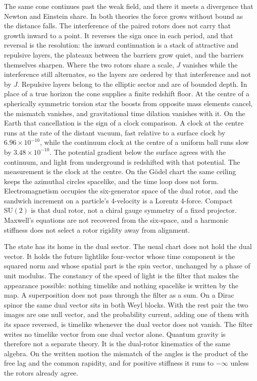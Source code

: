 \documentclass[a4paper]{article}
\begin{document}
The same cone continues past the weak field, and there it meets a divergence that Newton and Einstein share. In both theories the force grows without bound as the distance falls. The interference of the paired rotors does not carry that growth inward to a point. It reverses the sign once in each period, and that reversal is the resolution: the inward continuation is a stack of attractive and repulsive layers, the plateaux between the barriers grow quiet, and the barriers themselves sharpen. Where the two rotors share a scale, $J$ vanishes while the interference still alternates, so the layers are ordered by that interference and not by $J$. Repulsive layers belong to the elliptic sector and are of bounded depth. In place of a true horizon the cone supplies a finite redshift floor. At the centre of a spherically symmetric torsion star the boosts from opposite mass elements cancel, the mismatch vanishes, and gravitational time dilation vanishes with it. On the Earth that cancellation is the sign of a clock comparison. A clock at the centre runs at the rate of the distant vacuum, fast relative to a surface clock by \(6.96\times 10^{-10}\), while the continuum clock at the centre of a uniform ball runs slow by \(3.48\times 10^{-10}\). The potential gradient below the surface agrees with the continuum, and light from underground is redshifted with that potential. The measurement is the clock at the centre. On the Gödel chart the same ceiling keeps the azimuthal circles spacelike, and the time loop does not form. Electromagnetism occupies the six-generator space of the dual rotor, and the sandwich increment on a particle's 4-velocity is a Lorentz 4-force. Compact $\mathrm{SU}(2)$ is that dual rotor, not a chiral gauge symmetry of a fixed projector. Maxwell's equations are not recovered from the six-space, and a harmonic stiffness does not select a rotor rigidity away from alignment.

The state has its home in the dual sector. The usual chart does not hold the dual vector. It holds the future lightlike four-vector whose time component is the squared norm and whose spatial part is the spin vector, unchanged by a phase of unit modulus. The constancy of the speed of light is the filter that makes the appearance possible: nothing timelike and nothing spacelike is written by the map. A superposition does not pass through the filter as a sum. On a Dirac spinor the same dual vector sits in both Weyl blocks. With the rest pair the two images are one null vector, and the probability current, adding one of them with its space reversed, is timelike whenever the dual vector does not vanish. The filter writes no timelike vector from one dual vector alone. Quantum gravity is therefore not a separate theory. It is the dual-rotor kinematics of the same algebra. On the written motion the mismatch of the angles is the product of the free lag and the common rapidity, and for positive stiffness it runs to $-\infty$ unless the rotors already agree.
\end{document}
